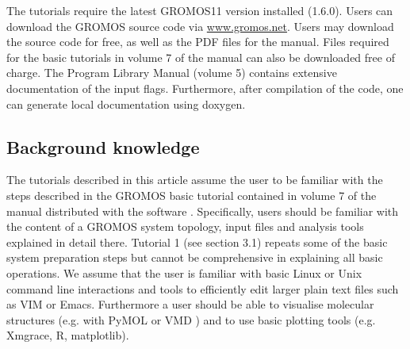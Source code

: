The tutorials require the latest GROMOS11 version installed (1.6.0). 
Users can download the GROMOS source code via \url{www.gromos.net}.  Users may download the source code for free, as well as the PDF files for the manual. Files required for the basic tutorials in volume 7 of the manual can also be downloaded free of charge.
The Program Library Manual (volume 5) \cite{volume_5} 
contains extensive documentation of the input flags. Furthermore, after compilation of the code, one can generate local documentation using doxygen.


\subsection{Background knowledge}
%
The tutorials described in this article assume the user to be familiar with the steps described in the GROMOS basic tutorial contained in volume 7 of the manual distributed with the software \cite{volume_7}. 
Specifically, users should be familiar with the content of a GROMOS system topology, input files and analysis tools explained in detail there.
Tutorial 1 (see section 3.1) repeats some of the basic system preparation steps but cannot be comprehensive in explaining all basic operations. We assume that the user is familiar with basic Linux or Unix 
command line interactions and tools to efficiently edit larger plain text files such as VIM or Emacs. Furthermore a user should be able to visualise molecular structures (e.g. with PyMOL \cite{pymol} or VMD \cite{HUMP96}) 
and to use basic plotting tools (e.g. Xmgrace, R, matplotlib).  

